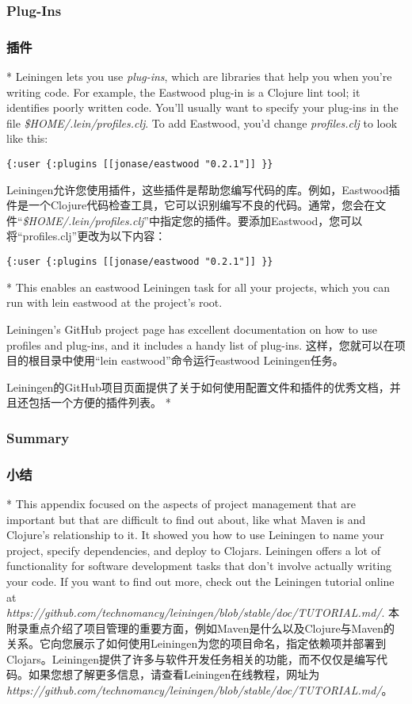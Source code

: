 \begin{paracol}{2}
\subsubsection{Plug-Ins}
\switchcolumn
\subsubsection{插件}
\switchcolumn[0]*
Leiningen lets you use \emph{plug-ins}, which are libraries that help
you when you're writing code. For example, the Eastwood plug-in is a
Clojure lint tool; it identifies poorly written code. You'll usually
want to specify your plug-ins in the file
\emph{\$HOME/.lein/profiles.clj}. To add Eastwood, you'd change
\emph{profiles.clj} to look like this:
\begin{verbatim}
{:user {:plugins [[jonase/eastwood "0.2.1"]] }}
\end{verbatim}
\switchcolumn
Leiningen允许您使用插件，这些插件是帮助您编写代码的库。例如，Eastwood插件是一个Clojure代码检查工具，它可以识别编写不良的代码。通常，您会在文件``\emph{\$HOME/.lein/profiles.clj}''中指定您的插件。要添加Eastwood，您可以将“profiles.clj”更改为以下内容：
\begin{verbatim}
{:user {:plugins [[jonase/eastwood "0.2.1"]] }}
\end{verbatim} 
\switchcolumn[0]*
This enables an eastwood Leiningen task for all your projects, which you
can run with lein eastwood at the project's root.

Leiningen's GitHub project page has excellent documentation on how to
use profiles and plug-ins, and it includes a handy list of plug-ins.
\switchcolumn
这样，您就可以在项目的根目录中使用“lein eastwood”命令运行eastwood Leiningen任务。

Leiningen的GitHub项目页面提供了关于如何使用配置文件和插件的优秀文档，并且还包括一个方便的插件列表。
\switchcolumn[0]*
\subsubsection{Summary}
\switchcolumn
\subsubsection{小结}
\switchcolumn[0]*
This appendix focused on the aspects of project management that are
important but that are difficult to find out about, like what Maven is
and Clojure's relationship to it. It showed you how to use Leiningen to
name your project, specify dependencies, and deploy to Clojars.
Leiningen offers a lot of functionality for software development tasks
that don't involve actually writing your code. If you want to find out
more, check out the Leiningen tutorial online at\\
\emph{https://github.com/technomancy/leiningen/blob/stable/doc/TUTORIAL.md/}.
\switchcolumn
本附录重点介绍了项目管理的重要方面，例如Maven是什么以及Clojure与Maven的关系。它向您展示了如何使用Leiningen为您的项目命名，指定依赖项并部署到Clojars。Leiningen提供了许多与软件开发任务相关的功能，而不仅仅是编写代码。如果您想了解更多信息，请查看Leiningen在线教程，网址为\\
\emph{https://github.com/technomancy/leiningen/blob/stable/doc/TUTORIAL.md/}。
\end{paracol}

